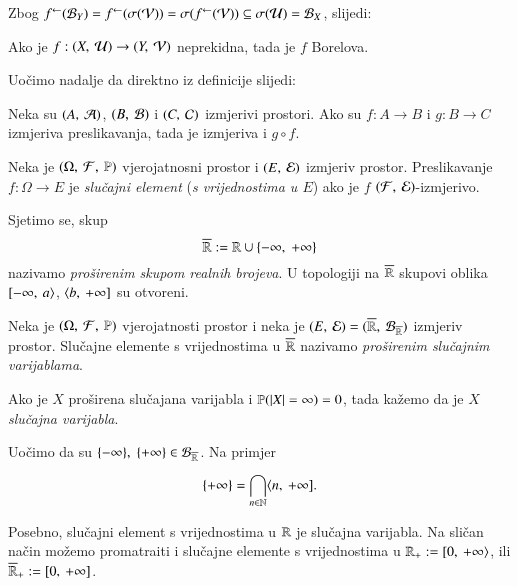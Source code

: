 Zbog ${f}^{\leftarrow}(\mathcal{B}_{Y}) = {f}^{\leftarrow}(\sigma({\mathcal{V}})) = \sigma({{f}^{\leftarrow}(\mathcal{V})}) \subseteq \sigma({\mathcal{U}}) = \mathcal{B}_{X}$, slijedi:

\begin{kor} \label{kor:3.5}
    Ako je $f: (X, \: \mathcal{U}) \to (Y, \: \mathcal{V})$ neprekidna, tada je $f$ Borelova.
\end{kor}

Uo\v cimo nadalje da direktno iz definicije slijedi:

\begin{lm}  \label{lm:3.6}
    Neka su $(A, \: \mathcal{A})$, $(B, \: \mathcal{B})$ i $(C, \: \mathcal{C})$ izmjerivi prostori. Ako su $f: A \to B$ i $g:B \to C$ izmjeriva preslikavanja, tada je izmjeriva i $g \circ f$.
\end{lm}

\begin{defn}    \label{defn:3.7}
    Neka je $(\Omega, \: \mathcal{F}, \: \mathbb{P})$ vjerojatnosni prostor i $(E, \: \mathcal{E})$ izmjeriv prostor. Preslikavanje $f: \Omega \to E$ je \emph{slu\v cajni element} (\emph{s vrijednostima u $E$}) ako je $f$
    $(\mathcal{F}, \: \mathcal{E})$-izmjerivo.
\end{defn}

\begin{nap} \label{nap:3.7-1}
    Sjetimo se, skup
    \begin{equation*}
        \overline{\mathbb{R}} := \mathbb{R} \cup \{ -\infty, \; +\infty \}
    \end{equation*}
    nazivamo \emph{pro\v sirenim skupom realnih brojeva}.
    U topologiji na $\overline{\mathbb{R}}$ skupovi oblika $[ {-\infty}, \: {a} \rangle$, $\langle {b}, \: {+\infty}]$ su otvoreni.
\end{nap}

\begin{defn}  \label{defn:3.8}
    Neka je $(\Omega, \: \mathcal{F}, \: \mathbb{P})$ vjerojatnosti prostor i neka je $({E}, \: {\mathcal{E}}) = ({\overline{\mathbb{R}}}, \: {\mathcal{B}_{\overline{\mathbb{R}}}})$ izmjeriv prostor.
    Slu\v cajne elemente s vrijednostima u $\overline{\mathbb{R}}$ nazivamo \emph{pro\v sirenim slu\v cajnim varijablama}.

    Ako je $X$ pro\v sirena slu\v cajana varijabla i $\mathbb{P}({|X| = \infty}) = 0$, tada ka\v zemo da je $X$ \emph{slu\v cajna varijabla}.
\end{defn}

\begin{nap} \label{nap:3.8-1}
    Uo\v cimo da su $\{ -\infty \}, \; \{+\infty\} \in \mathcal{B}_{\overline{\mathbb{R}}}$.
    Na primjer
    \begin{equation*}
        \{+\infty\} = \bigcap\limits_{n \in \mathbb{N}}^{} \langle {n}, \: {+\infty}].
    \end{equation*}
    
    Posebno, slu\v cajni element s vrijednostima u $\mathbb{R}$ je slu\v cajna varijabla.
    Na sli\v can na\v cin mo\v zemo promatraiti i slu\v cajne elemente s vrijednostima u $\mathbb{R}_+ := [ {0}, \: {+\infty} \rangle$, ili $\overline{\mathbb{R}}_+ := [{0}, \:{+\infty}]$. 
\end{nap}

